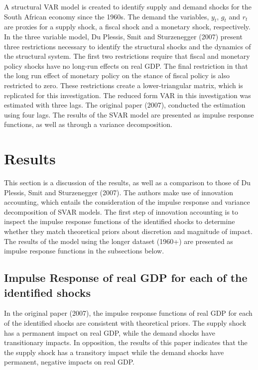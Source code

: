 \documentclass[11pt,preprint, authoryear]{elsarticle}
\numberwithin{equation}{section}
\numberwithin{figure}{section}
\numberwithin{table}{section}
\begin{document}
A structural VAR model is created to identify supply and demand shocks
for the South African economy since the 1960s. The demand the variables,
\(y_t\), \(g_t\) and \(r_t\) are proxies for a supply shock, a fiscal
shock and a monetary shock, respectively. In the three variable model,
Du Plessis, Smit and Sturzenegger (2007) present three restrictions
necessary to identify the structural shocks and the dynamics of the
structural system. The first two restrictions require that fiscal and
monetary policy shocks have no long-run effects on real GDP. The final
restriction in that the long run effect of monetary policy on the stance
of fiscal policy is also restricted to zero. These restrictions create a
lower-triangular matrix, which is replicated for this investigation. The
reduced form VAR in this investigation was estimated with three lags.
The original paper (2007), conducted the estimation using four lags. The
results of the SVAR model are presented as impulse response functions,
as well as through a variance decomposition.

\hypertarget{results}{%
\section{Results}\label{results}}

This section is a discussion of the results, as well as a comparison to
those of Du Plessis, Smit and Sturzenegger (2007). The authors make use
of innovation accounting, which entails the consideration of the impulse
response and variance decomposition of SVAR models. The first step of
innovation accounting is to inspect the impulse response functions of
the identified shocks to determine whether they match theoretical priors
about discretion and magnitude of impact. The results of the model using
the longer dataset (1960+) are presented as impulse response functions
in the subsections below.

\hypertarget{impulse-response-of-real-gdp-for-each-of-the-identified-shocks}{%
\subsection{Impulse Response of real GDP for each of the identified
shocks}\label{impulse-response-of-real-gdp-for-each-of-the-identified-shocks}}

In the original paper (2007), the impulse response functions of real GDP
for each of the identified shocks are consistent with theoretical
priors. The supply shock has a permanent impact on real GDP, while the
demand shocks have transitionary impacts. In opposition, the results of
this paper indicates that the the supply shock has a transitory impact
while the demand shocks have permanent, negative impacts on real GDP.
\end{document}
